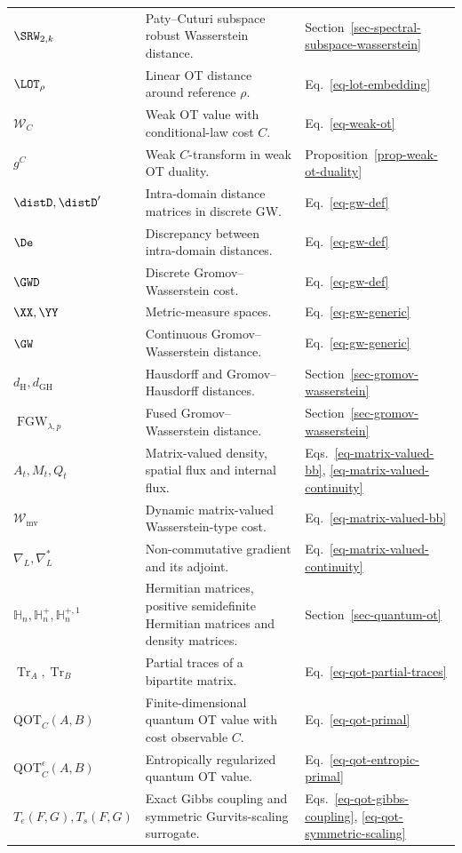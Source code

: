 {\begin{longtable}{>{\raggedright\arraybackslash}p{}
                  >{\raggedright\arraybackslash}p{}
                  >{\raggedright\arraybackslash}p{}}
$\SRW_{2,k}$ & Paty--Cuturi subspace robust Wasserstein distance. & Section~\ref{sec-spectral-subspace-wasserstein} \\
$\LOT_\rho$ & Linear OT distance around reference $\rho$. & Eq.~\eqref{eq-lot-embedding} \\
$\mathcal{W}_C$ & Weak OT value with conditional-law cost $C$. & Eq.~\eqref{eq-weak-ot} \\
$g^C$ & Weak $C$-transform in weak OT duality. & Proposition~\ref{prop-weak-ot-duality} \\
$\distD,\distD'$ & Intra-domain distance matrices in discrete GW. & Eq.~\eqref{eq-gw-def} \\
$\De$ & Discrepancy between intra-domain distances. & Eq.~\eqref{eq-gw-def} \\
$\GWD$ & Discrete Gromov--Wasserstein cost. & Eq.~\eqref{eq-gw-def} \\
$\XX,\YY$ & Metric-measure spaces. & Eq.~\eqref{eq-gw-generic} \\
$\GW$ & Continuous Gromov--Wasserstein distance. & Eq.~\eqref{eq-gw-generic} \\
$d_{\mathrm H},d_{\mathrm{GH}}$ & Hausdorff and Gromov--Hausdorff distances. & Section~\ref{sec-gromov-wasserstein} \\
$\operatorname{FGW}_{\lambda,p}$ & Fused Gromov--Wasserstein distance. & Section~\ref{sec-gromov-wasserstein} \\
$A_t,M_t,Q_t$ & Matrix-valued density, spatial flux and internal flux. & Eqs.~\eqref{eq-matrix-valued-bb}, \eqref{eq-matrix-valued-continuity} \\
$\mathcal W_{\mathrm{mv}}$ & Dynamic matrix-valued Wasserstein-type cost. & Eq.~\eqref{eq-matrix-valued-bb} \\
$\nabla_L,\nabla_L^*$ & Non-commutative gradient and its adjoint. & Eq.~\eqref{eq-matrix-valued-continuity} \\
$\mathbb H_n,\mathbb H_n^+,\mathbb H_n^{+,1}$ & Hermitian matrices, positive semidefinite Hermitian matrices and density matrices. & Section~\ref{sec-quantum-ot} \\
$\operatorname{Tr}_A,\operatorname{Tr}_B$ & Partial traces of a bipartite matrix. & Eq.~\eqref{eq-qot-partial-traces} \\
$\mathrm{QOT}_C(A,B)$ & Finite-dimensional quantum OT value with cost observable $C$. & Eq.~\eqref{eq-qot-primal} \\
$\mathrm{QOT}_C^\epsilon(A,B)$ & Entropically regularized quantum OT value. & Eq.~\eqref{eq-qot-entropic-primal} \\
$T_e(F,G),T_s(F,G)$ & Exact Gibbs coupling and symmetric Gurvits-scaling surrogate. & Eqs.~\eqref{eq-qot-gibbs-coupling}, \eqref{eq-qot-symmetric-scaling} \\


\end{longtable}}
